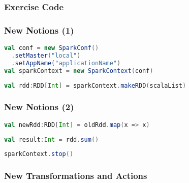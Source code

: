 \documentclass[slidetop,9pt,utf8]{beamer}
\begin{document}
\begin{CJK}{UTF8}{gbsn}
\begin{frame}
\end{frame}

\begin{frame}
  \frametitle{Exercise Code}

  

\end{frame}

\begin{frame}[fragile]
  \frametitle{New Notions (1)}

  \begin{lstlisting}[label=InitSparkContext, caption=Init Spark Context, language=scala, style=code]
val conf = new SparkConf()
  .setMaster("local")
  .setAppName("applicationName")
val sparkContext = new SparkContext(conf)
  \end{lstlisting}

  \begin{lstlisting}[label=ListToRdd, caption=Load List as RDD, language=scala, style=code]
val rdd:RDD[Int] = sparkContext.makeRDD(scalaList)
  \end{lstlisting}

\end{frame}

\begin{frame}[fragile]
  \frametitle{New Notions (2)}

  \begin{lstlisting}[label=RDDTransformation, caption=Apply transformation to RDD, language=scala, style=code]
val newRdd:RDD[Int] = oldRdd.map(x => x)
  \end{lstlisting}

  \begin{lstlisting}[label=RDDAction, caption=Apply action to RDD, language=scala, style=code]
val result:Int = rdd.sum()
  \end{lstlisting}

  \begin{lstlisting}[label=StopSparkContext, caption=Stop Spark Context, language=scala, style=code]
sparkContext.stop()
  \end{lstlisting}

\end{frame}

\begin{frame}

  \frametitle{New Transformations and Actions}


\end{frame}
\end{CJK}
\end{document}
